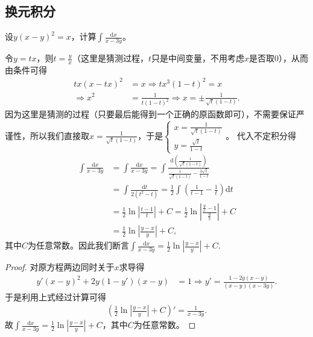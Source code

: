 \documentclass[../../main.tex]{subfiles}%
\begin{document}
\subsection{换元积分}

\begin{example}
设\(y(x - y)^2 = x\)，计算\(\int \frac{\mathrm{d}x}{x - 3y}\)。 
\end{example}
\begin{note}
令\(y = tx\)，则\(t = \frac{y}{x}\)（这里是猜测过程，\(t\)只是中间变量，不用考虑\(x\)是否取\(0\)），从而由条件可得
\begin{align*}
tx(x - tx)^2 &= x \Rightarrow tx^3(1 - t)^2 = x\\
\Rightarrow x^2&=\frac{1}{t(1 - t)^2} \Rightarrow x = \pm\frac{1}{\sqrt{t}(1 - t)}.
\end{align*}
因为这里是猜测的过程（只要最后能得到一个正确的原函数即可），不需要保证严谨性，所以我们直接取\(x=\frac{1}{\sqrt{t}(1 - t)}\)，于是\(\begin{cases}
x=\frac{1}{\sqrt{t}(1 - t)}\\
y=\frac{\sqrt{t}}{1 - t}
\end{cases}\)。
代入不定积分得
\begin{align*}
\int{\frac{\mathrm{d}x}{x - 3y}}&=\int{\frac{\mathrm{d}x}{x - 3y}}=\int{\frac{\mathrm{d}\left(\frac{1}{\sqrt{t}(1 - t)}\right)}{\frac{1}{\sqrt{t}(1 - t)}-\frac{3\sqrt{t}}{1 - t}}}\\
&=\int{\frac{\mathrm{d}t}{2(t^2 - t)}}=\frac{1}{2}\int{\left(\frac{1}{t - 1}-\frac{1}{t}\right)\mathrm{d}t}\\
&=\frac{1}{2}\ln\left|\frac{t - 1}{t}\right| + C=\frac{1}{2}\ln\left|\frac{\frac{y}{x}-1}{\frac{y}{x}}\right| + C\\
&=\frac{1}{2}\ln\left|\frac{y - x}{y}\right| + C,
\end{align*}
其中\(C\)为任意常数。因此我们断言\(\int{\frac{\mathrm{d}x}{x - 3y}}=\frac{1}{2}\ln\left|\frac{y - x}{y}\right| + C\).
\end{note}
\begin{proof}

对原方程两边同时关于\(x\)求导得
\begin{align*}
y'(x - y)^2 + 2y(1 - y')(x - y) &= 1 \Rightarrow y'=\frac{1 - 2y(x - y)}{(x - y)(x - 3y)}.
\end{align*}
于是利用上式经过计算可得
\begin{align*}
\left(\frac{1}{2}\ln\left|\frac{y - x}{y}\right| + C\right)'=\frac{1}{x - 3y}.
\end{align*}
故\(\int{\frac{\mathrm{d}x}{x - 3y}}=\frac{1}{2}\ln\left|\frac{y - x}{y}\right| + C\)，其中\(C\)为任意常数。 

\end{proof}
\end{document}
